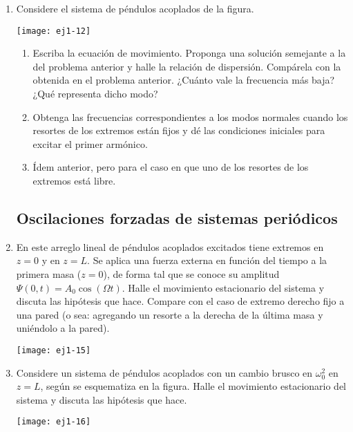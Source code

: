 \documentclass[11pt,spanish,a4paper]{article}
\begin{document}
\begin{enumerate}
\item
\begin{minipage}[t][2cm]{0.6\textwidth}
 Considere el sistema de péndulos acoplados de la figura. 
\end{minipage}
\begin{minipage}[c][2cm][t]{0.35\textwidth}
  \texttt{[image: ej1-12]}
\end{minipage}
\begin{enumerate}
	\item Escriba la ecuación de movimiento. Proponga una solución semejante a la del problema anterior y halle la relación de dispersión. Compárela con la obtenida en el problema anterior.
	¿Cuánto vale la frecuencia más baja?
	¿Qué representa dicho modo? 
	\item Obtenga las frecuencias correspondientes a los modos normales cuando los resortes de los extremos están fijos y dé las condiciones iniciales para excitar el primer armónico. 
	\item Ídem anterior, pero para el caso en que uno de los resortes de los extremos está libre. 
\end{enumerate}


\subsection*{Oscilaciones forzadas de sistemas periódicos}


\item
\begin{minipage}[t][3.5cm]{0.6\textwidth}
En este arreglo lineal de péndulos acoplados excitados tiene extremos en $z= 0$ y en $z= L$.
Se aplica una fuerza externa en función del tiempo a la primera masa ($z=0$), de forma tal que se conoce su amplitud $\Psi(0,t)= A_0 \cos(\Omega t)$.
Halle el movimiento estacionario del sistema y discuta las hipótesis que hace.
Compare con el caso de extremo derecho fijo a una pared (o sea: agregando un resorte a la derecha de la última masa y uniéndolo a la pared). 
\end{minipage}
\begin{minipage}[c][0cm][t]{0.35\textwidth}
  \texttt{[image: ej1-15]}
\end{minipage}



\item
\begin{minipage}[t][4cm]{0.35\textwidth}
Considere un sistema de péndulos acoplados con un cambio brusco en $\omega_{0}^{2}$ en $z=L$, según se esquematiza en la figura.
Halle el movimiento estacionario del sistema y discuta las hipótesis que hace.
\end{minipage}
\begin{minipage}[c][1cm][t]{0.6\textwidth}
  \texttt{[image: ej1-16]}
\end{minipage}




\end{enumerate}
\end{document}

